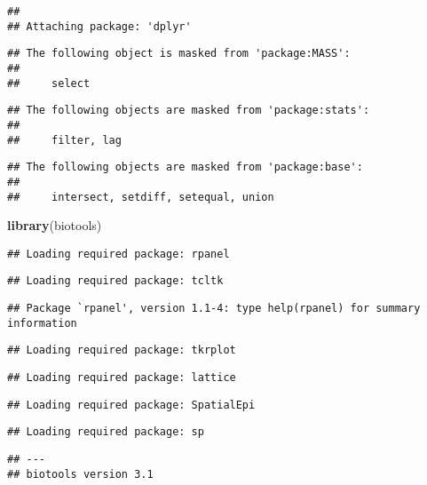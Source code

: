 \documentclass[]{article}
\newenvironment{Shaded}{\begin{snugshade}}{\end{snugshade}}
\newcommand{\KeywordTok}[1]{\textcolor[rgb]{0.13,0.29,0.53}{\textbf{#1}}}
\newcommand{\NormalTok}[1]{#1}
\begin{document}
\begin{verbatim}
## 
## Attaching package: 'dplyr'
\end{verbatim}

\begin{verbatim}
## The following object is masked from 'package:MASS':
## 
##     select
\end{verbatim}

\begin{verbatim}
## The following objects are masked from 'package:stats':
## 
##     filter, lag
\end{verbatim}

\begin{verbatim}
## The following objects are masked from 'package:base':
## 
##     intersect, setdiff, setequal, union
\end{verbatim}

\begin{Shaded}
\begin{Highlighting}[]
\KeywordTok{library}\NormalTok{(biotools)}
\end{Highlighting}
\end{Shaded}

\begin{verbatim}
## Loading required package: rpanel
\end{verbatim}

\begin{verbatim}
## Loading required package: tcltk
\end{verbatim}

\begin{verbatim}
## Package `rpanel', version 1.1-4: type help(rpanel) for summary information
\end{verbatim}

\begin{verbatim}
## Loading required package: tkrplot
\end{verbatim}

\begin{verbatim}
## Loading required package: lattice
\end{verbatim}

\begin{verbatim}
## Loading required package: SpatialEpi
\end{verbatim}

\begin{verbatim}
## Loading required package: sp
\end{verbatim}

\begin{verbatim}
## ---
## biotools version 3.1
\end{verbatim}
\end{document}
